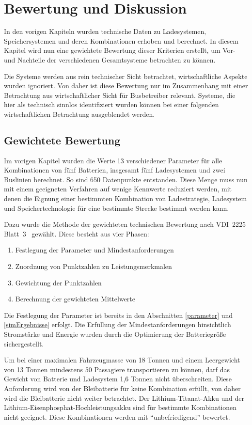\chapter{Bewertung und Diskussion} %
\label{chap5}
In den vorigen Kapiteln wurden technische Daten zu Ladesystemen, Speichersystemen und deren Kombinationen erhoben und berechnet. In diesem Kapitel wird nun eine gewichtete Bewertung dieser Kriterien erstellt, um Vor- und Nachteile der verschiedenen Gesamtsysteme betrachten zu können.

Die Systeme werden aus rein technischer Sicht betrachtet, wirtschaftliche Aspekte wurden ignoriert. Von daher ist diese Bewertung nur im Zusammenhang mit einer Betrachtung aus wirtschaftlicher Sicht für Busbetreiber relevant. Systeme, die hier als technisch sinnlos identifiziert wurden können bei einer folgenden wirtschaftlichen Betrachtung ausgeblendet werden.

\section{Gewichtete Bewertung}
Im vorigen Kapitel wurden die Werte 13 verschiedener Parameter für alle Kombinationen von fünf Batterien, insgesamt fünf Ladesystemen und zwei Buslinien berechnet. So sind 650 Datenpunkte entstanden. Diese Menge muss nun mit einem geeigneten Verfahren auf wenige Kennwerte reduziert werden, mit denen die Eignung einer bestimmten Kombination von Ladestrategie, Ladesystem und Speichertechnologie für eine bestimmte Strecke bestimmt werden kann.

Dazu wurde die Methode der gewichteten technischen Bewertung nach VDI~2225 Blatt~3~\cite{vdi:2225} gewählt. Diese besteht aus vier Phasen:
\begin{enumerate}
	\item Festlegung der Parameter und Mindestanforderungen
	\item Zuordnung von Punktzahlen zu Leistungsmerkmalen
	\item Gewichtung der Punktzahlen
	\item Berechnung der gewichteten Mittelwerte
\end{enumerate}

Die Festlegung der Parameter ist bereits in den Abschnitten \ref{parameter} und \ref{simErgebnisse} erfolgt. Die Erfüllung der Mindestanforderungen hinsichtlich Stromstärke und Energie wurden durch die Optimierung der Batteriegröße sichergestellt.

Um bei einer maximalen Fahrzeugmasse von 18 Tonnen und einem Leergewicht von 13 Tonnen mindestens 50 Passagiere transportieren zu können, darf das Gewicht von Batterie und Ladesystem 1,6 Tonnen nicht überschreiten. Diese Anforderung wird von der Bleibatterie für keine Kombination erfüllt, von daher wird die Bleibatterie nicht weiter betrachtet. Der Lithium-Titanat-Akku und der Lithium-Eisenphosphat-Hochleistungsakku sind für bestimmte Kombinationen nicht geeignet. Diese Kombinationen werden mit "`unbefriedigend"' bewertet.

